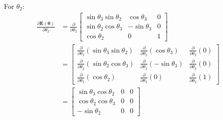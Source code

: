 \documentclass[titlepage]{article}
\begin{document}
For $\theta_2$:
\begin{equation}
	\begin{split}
		\frac{\partial\boldsymbol{E}(\boldsymbol{\theta})}{\partial\theta_2}&=\frac{\partial}{\partial\theta_2}
		\begin{bmatrix}
			\sin\theta_3\sin\theta_2 & \cos\theta_3 & 0 \\
			\sin\theta_2\cos\theta_3 & -\sin\theta_3 & 0 \\
			\cos\theta_2 & 0 & 1
		\end{bmatrix} \\
		&=
		\begin{bmatrix}
			\frac{\partial}{\partial\theta_2}\left(\sin\theta_3\sin\theta_2\right) & \frac{\partial}{\partial\theta_2}\left(\cos\theta_3\right) & \frac{\partial}{\partial\theta_2}\left(0\right) \\
			\frac{\partial}{\partial\theta_2}\left(\sin\theta_2\cos\theta_3\right) & \frac{\partial}{\partial\theta_2}\left(-\sin\theta_3\right) & \frac{\partial}{\partial\theta_2}\left(0\right) \\
			\frac{\partial}{\partial\theta_2}\left(\cos\theta_2\right) & \frac{\partial}{\partial\theta_2}\left(0\right) & \frac{\partial}{\partial\theta_2}\left(1\right)
		\end{bmatrix} \\
		&=
		\begin{bmatrix}
			\sin\theta_3\cos\theta_2 & 0 & 0 \\
			\cos\theta_2\cos\theta_3 & 0 & 0 \\
			-\sin\theta_2 & 0 & 0
		\end{bmatrix}
	\end{split}
\end{equation}
\end{document}

